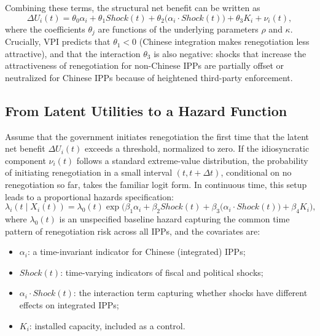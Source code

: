 \documentclass[12pt]{article}
\begin{document}
Combining these terms, the structural net benefit can be written as
\[
  \Delta U_i(t)
  = \theta_0 \alpha_i
  + \theta_1 Shock(t)
  + \theta_2 \big(\alpha_i \cdot Shock(t)\big)
  + \theta_3 K_i
  + \nu_i(t),
\]
where the coefficients $\theta_j$ are functions of the underlying parameters $\rho$ and $\kappa$. Crucially, VPI predicts that $\theta_1 < 0$ (Chinese integration makes renegotiation less attractive), and that the interaction $\theta_3$ is also negative: shocks that increase the attractiveness of renegotiation for non-Chinese IPPs are partially offset or neutralized for Chinese IPPs because of heightened third-party enforcement.

\subsection*{From Latent Utilities to a Hazard Function}

Assume that the government initiates renegotiation the first time that the latent net benefit $\Delta U_i(t)$ exceeds a threshold, normalized to zero. If the idiosyncratic component $\nu_i(t)$ follows a standard extreme-value distribution, the probability of initiating renegotiation in a small interval $(t, t + \Delta t)$, conditional on no renegotiation so far, takes the familiar logit form. In continuous time, this setup leads to a proportional hazards specification:
\[
  \lambda_i(t \mid X_i(t))
  = \lambda_0(t) \exp\big( \beta_1 \alpha_i 
                           + \beta_2 Shock(t)
                           + \beta_3 \big(\alpha_i \cdot Shock(t)\big)
                           + \beta_4 K_i \big),
\]
where $\lambda_0(t)$ is an unspecified baseline hazard capturing the common time pattern of renegotiation risk across all IPPs, and the covariates are:
\begin{itemize}
  \item $\alpha_i$: a time-invariant indicator for Chinese (integrated) IPPs;
  \item $Shock(t)$: time-varying indicators of fiscal and political shocks;
  \item $\alpha_i \cdot Shock(t)$: the interaction term capturing whether shocks have different effects on integrated IPPs;
  \item $K_i$: installed capacity, included as a control.
\end{itemize}
\end{document}
